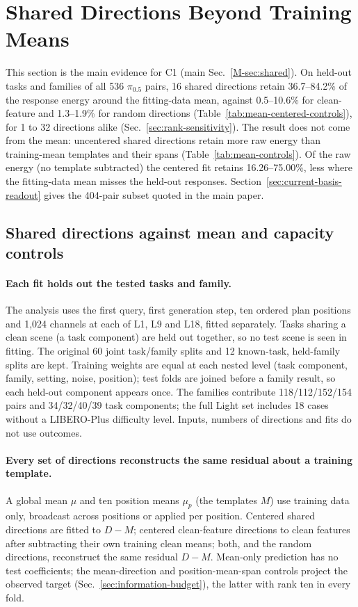 \section{Shared Directions Beyond Training Means}
\label{sec:mean-controls}
This section is the main evidence for C1 (main Sec.~\ref{M-sec:shared}). On held-out tasks and families of all 536 $\pi_{0.5}$ pairs, 16 shared directions retain 36.7--84.2\% of the response energy around the fitting-data mean, against 0.5--10.6\% for clean-feature and 1.3--1.9\% for random directions (Table~\ref{tab:mean-centered-controls}), for 1 to 32 directions alike (Sec.~\ref{sec:rank-sensitivity}). The result does not come from the mean: uncentered shared directions retain more raw energy than training-mean templates and their spans (Table~\ref{tab:mean-controls}). Of the raw energy (no template subtracted) the centered fit retains 16.26--75.00\%, less where the fitting-data mean misses the held-out responses. Section~\ref{sec:current-basis-readout} gives the 404-pair subset quoted in the main paper.

\subsection{Shared directions against mean and capacity controls}
\paragraph{Each fit holds out the tested tasks and family.}
The analysis uses the first query, first generation step, ten ordered plan positions and 1,024 channels at each of L1, L9 and L18, fitted separately. Tasks sharing a clean scene (a task component) are held out together, so no test scene is seen in fitting. The original 60 joint task/family splits and 12 known-task, held-family splits are kept. Training weights are equal at each nested level (task component, family, setting, noise, position); test folds are joined before a family result, so each held-out component appears once. The families contribute 118/112/152/154 pairs and 34/32/40/39 task components; the full Light set includes 18 cases without a LIBERO-Plus difficulty level. Inputs, numbers of directions and fits do not use outcomes.

\paragraph{Every set of directions reconstructs the same residual about a training template.}
A global mean $\mu$ and ten position means $\mu_p$ (the templates $M$) use training data only, broadcast across positions or applied per position. Centered shared directions are fitted to $D-M$; centered clean-feature directions to clean features after subtracting their own training clean means; both, and the random directions, reconstruct the same residual $D-M$. Mean-only prediction has no test coefficients; the mean-direction and position-mean-span controls project the observed target (Sec.~\ref{sec:information-budget}), the latter with rank ten in every fold.

